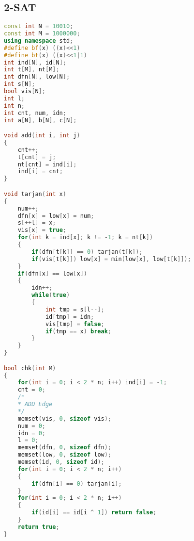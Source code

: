 ﻿\subsection{2-SAT}
    \begin{lstlisting}[language=C++]
const int N = 10010;
const int M = 1000000;
using namespace std;
#define bf(x) ((x)<<1)
#define bt(x) ((x)<<1|1)
int ind[N], id[N];
int t[M], nt[M];
int dfn[N], low[N];
int s[N];
bool vis[N];
int l;
int n;
int cnt, num, idn;
int a[N], b[N], c[N];

void add(int i, int j)
{
    cnt++;
    t[cnt] = j;
    nt[cnt] = ind[i];
    ind[i] = cnt;
}

void tarjan(int x)
{
    num++;
    dfn[x] = low[x] = num;
    s[++l] = x;
    vis[x] = true;
    for(int k = ind[x]; k != -1; k = nt[k])
    {
        if(dfn[t[k]] == 0) tarjan(t[k]);
        if(vis[t[k]]) low[x] = min(low[x], low[t[k]]);
    }
    if(dfn[x] == low[x])
    {
        idn++;
        while(true)
        {
            int tmp = s[l--];
            id[tmp] = idn;
            vis[tmp] = false;
            if(tmp == x) break;
        }
    }
}

bool chk(int M)
{
    for(int i = 0; i < 2 * n; i++) ind[i] = -1;
    cnt = 0;
	/*
	* ADD Edge
	*/
    memset(vis, 0, sizeof vis);
    num = 0;
    idn = 0;
    l = 0;
    memset(dfn, 0, sizeof dfn);
    memset(low, 0, sizeof low);
    memset(id, 0, sizeof id);
    for(int i = 0; i < 2 * n; i++)
    {
        if(dfn[i] == 0) tarjan(i);
    }
    for(int i = 0; i < 2 * n; i++)
    {
        if(id[i] == id[i ^ 1]) return false;
    }
    return true;
}

    \end{lstlisting}